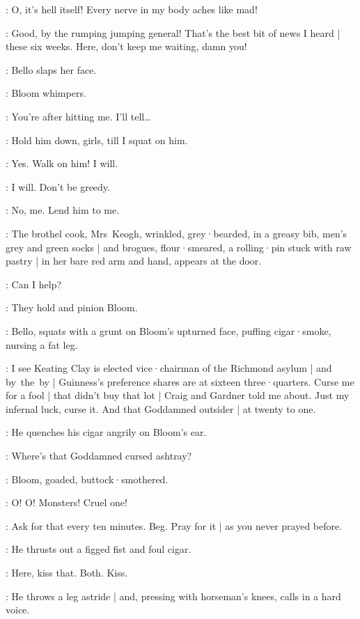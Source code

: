 \Bloom:
O,
it's hell itself!
Every nerve in my body aches like mad!

\Bello:
Good,
by the rumping jumping general!
%
That's the best bit of news I heard |
these six weeks.
Here,
don't keep me waiting,
damn you!

:
Bello slaps her face.

:
Bloom whimpers.

\Bloom:
You're after hitting me.
I'll tell…

\Bello:
Hold him down,
girls,
till I squat on him.

\Zoe:
Yes.
Walk on him!
I will.

\Florry:
I will.
%
Don't be greedy.

\Kitty:
No,
me.
Lend him to me.

:
The brothel cook,
Mrs~Keogh,
wrinkled,
grey·bearded,
in a greasy bib,
men's grey and green socks |
and brogues,
flour·smeared,
a rolling·pin stuck with raw pastry |
in her bare red arm and hand,
appears at the door.

\MrsKeogh:
Can I help?

:
They hold and pinion Bloom.

:
Bello,
squats with a grunt on Bloom's upturned face,
%
puffing cigar·smoke,
nursing a fat leg.

\Bello:
I see Keating Clay is elected vice·chairman of the Richmond asylum |
and by~the~by |
Guinness's preference shares are at sixteen three·quarters.
Curse me for a fool |
that didn't buy that lot |
Craig and Gardner told me about.
Just my infernal luck,
curse it.
And that Goddamned outsider  |
at twenty to one.

:
He quenches his cigar angrily on Bloom's ear.

\Bello:
Where's that Goddamned cursed ashtray?

:
Bloom,
goaded,
buttock·smothered.

\Bloom:
O!
O!
Monsters!
Cruel one!

\Bello:
%
Ask for that every ten minutes.
Beg.
Pray for it |
as you never prayed before.

:
He thrusts out a figged fist and foul cigar.

\Bello:
Here,
kiss that.
Both.
Kiss.

:
He throws a leg astride |
and,
pressing with horseman's knees,
calls in a hard voice.

